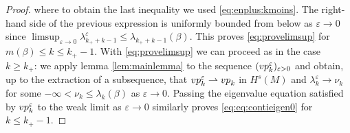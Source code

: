 \documentclass[10pt,a4paper]{amsart}
\def\ep{{\varepsilon}}
\newcommand{\vp}{{\rm vp}}
\begin{document}
\begin{proof}
where to obtain the last inequality we used \eqref{eq:enplus:kmoins}. The right-hand side of the previous expression is uniformly bounded from below as $\ep \to 0$ since $\limsup_{\ep\to 0} \lambda_{k_++k-1}^\ep \leq \lambda_{k_++k-1}(\beta)$. This proves  \eqref{eq:provelimsup} for $m(\beta) \leq k\leq k_+-1$. With  \eqref{eq:provelimsup} we can proceed as in the case $k\geq k_+$: we apply lemma \ref{lem:mainlemma} to the sequence $(\vp_k^\ep)_{\ep >0}$ and obtain, up to the extraction of a subsequence, that $\vp_k^\ep \rightharpoonup \vp_k$ in $H^s(M)$  and $\lambda_k^\ep \to \nu_k$ for some $-\infty < \nu_k \le \lambda_k(\beta)$ as $\ep \to 0$. Passing the eigenvalue equation satisfied by $\vp_k^{\ep}$ to the weak limit as $\ep \to 0$ similarly proves \eqref{eq:eq:contieigen0} for $k \leq k_+-1$. %

\smallskip


\end{proof}
\end{document}
